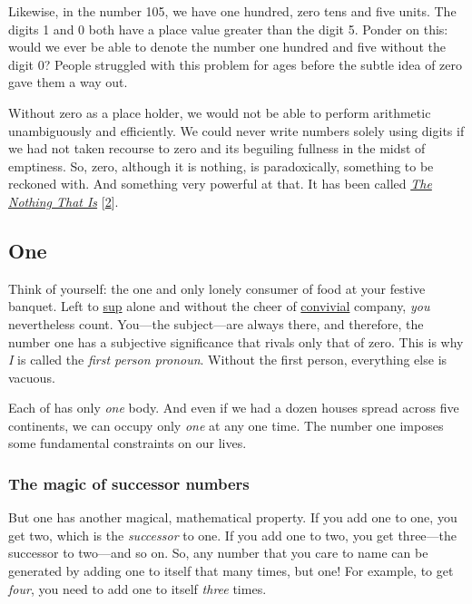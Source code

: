 \documentclass[
  a4paper,
]{article}
\begin{document}
Likewise, in the number 105, we have one hundred, zero tens and five
units. The digits 1 and 0 both have a place value greater than the digit
5. Ponder on this: would we ever be able to denote the number one
hundred and five without the digit 0? People struggled with this problem
for ages before the subtle idea of zero gave them a way out.

Without zero as a place holder, we would not be able to perform
arithmetic unambiguously and efficiently. We could never write numbers
solely using digits if we had not taken recourse to zero and its
beguiling fullness in the midst of emptiness. So, zero, although it is
nothing, is paradoxically, something to be reckoned with. And something
very powerful at that. It has been called
\href{https://www.amazon.in/Nothing-That-Natural-History-Zero/dp/0195142373}{\emph{The
Nothing That Is}} {[}\protect\hyperlink{ref-zero2000}{2}{]}.

\hypertarget{one}{%
\subsection{One}\label{one}}

Think of yourself: the one and only lonely consumer of food at your
festive banquet. Left to
\href{https://www.thefreedictionary.com/sup}{sup} alone and without the
cheer of \href{https://www.dictionary.com/browse/convivial}{convivial}
company, \emph{you} nevertheless count. You---the subject---are always
there, and therefore, the number one has a subjective significance that
rivals only that of zero. This is why \emph{I} is called the \emph{first
person pronoun}. Without the first person, everything else is vacuous.

Each of has only \emph{one} body. And even if we had a dozen houses
spread across five continents, we can occupy only \emph{one} at any one
time. The number one imposes some fundamental constraints on our lives.

\hypertarget{the-magic-of-successor-numbers}{%
\subsubsection{The magic of successor
numbers}\label{the-magic-of-successor-numbers}}

But one has another magical, mathematical property. If you add one to
one, you get two, which is the \emph{successor} to one. If you add one
to two, you get three---the successor to two---and so on. So, any number
that you care to name can be generated by adding one to itself that many
times, but one! For example, to get \emph{four}, you need to add one to
itself \emph{three} times.
\end{document}
